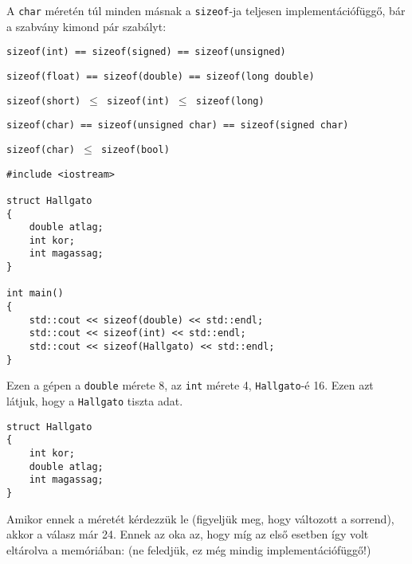 \documentclass[a4paper,11.5pt,table]{article}
\begin{document}
	\medskip
	A \texttt{char} méretén túl minden másnak a \texttt{sizeof}-ja teljesen implementációfüggő, bár a szabvány kimond pár szabályt:
	\begin{center}
		\texttt{sizeof(int) == sizeof(signed) == sizeof(unsigned)}
		\smallskip
		
		\texttt{sizeof(float) == sizeof(double) == sizeof(long double)}
		\smallskip
		
		\texttt{sizeof(short) $\leq$ sizeof(int) $\leq$ sizeof(long)}
		\smallskip
		
		\texttt{sizeof(char) == sizeof(unsigned char) == sizeof(signed char)}
		\smallskip
		
		\texttt{sizeof(char) $\leq$ sizeof(bool)}
		\smallskip
	\end{center}
	\begin{lstlisting}
#include <iostream>

struct Hallgato
{
	double atlag;
	int kor;
	int magassag;
}

int main()
{
	std::cout << sizeof(double) << std::endl;
	std::cout << sizeof(int) << std::endl;
	std::cout << sizeof(Hallgato) << std::endl;
}
	\end{lstlisting}
	Ezen a gépen a \texttt{double} mérete 8, az \texttt{int} mérete 4, \texttt{Hallgato}-é 16. Ezen azt látjuk, hogy a \texttt{Hallgato} tiszta adat.
	\begin{lstlisting}
struct Hallgato
{
	int kor;
	double atlag;
	int magassag;
}
	\end{lstlisting} 
	Amikor ennek a méretét kérdezzük le (figyeljük meg, hogy változott a sorrend), akkor a válasz már 24. Ennek az oka az, hogy míg az első esetben így volt eltárolva a memóriában: (ne feledjük, ez még mindig implementációfüggő!)
	\begin{figure}[H]
		\centering
	\end{figure}
\end{document}
